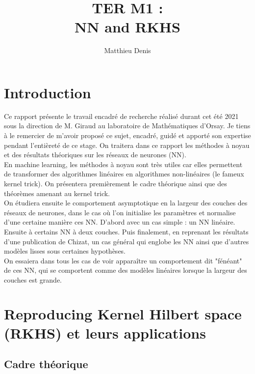 \documentclass[a4paper, 11pt, french]{article}
\title{TER M1 : \\ NN and RKHS}
\author{Matthieu Denis}
\theoremstyle{definition}
\begin{document}
	
	\maketitle
	\newpage
	
	\tableofcontents
	\newpage
	
	\section{Introduction}
	
	Ce rapport présente le travail encadré de recherche réalisé durant cet été 2021 sous la direction de M. Giraud au laboratoire de Mathématiques d'Orsay. Je tiens à le remercier de m'avoir proposé ce sujet, encadré, guidé et apporté son expertise pendant l'entièreté de ce stage. On traitera dans ce rapport les méthodes à noyau et des résultats théoriques sur les réseaux de neurones (NN). \\
	
	En machine learning, les méthodes à noyau sont très utiles car elles permettent de transformer des algorithmes linéaires en algorithmes non-linéaires (le fameux kernel trick). On présentera premièrement le cadre théorique ainsi que des théorèmes amenant au kernel trick. \\
	
	On étudiera ensuite le comportement asymptotique en la largeur des couches des réseaux de neurones, dans le cas où l'on initialise les paramètres et normalise d'une certaine manière ces NN. D'abord avec un cas simple : un NN linéaire. Ensuite à certains NN à deux couches. Puis finalement, en reprenant les résultats d'une publication de Chizat, un cas général qui englobe les NN ainsi que d'autres modèles lisses sous certaines hypothèses.  \\
	
	On essaiera dans tous les cas de voir apparaître un comportement dit "fénéant" de ces NN, qui se comportent comme des modèles linéaires lorsque la largeur des couches est grande.
	
	\newpage
	
	\section{Reproducing Kernel Hilbert space (RKHS) et leurs applications}
	
	\subsection{Cadre théorique}
	
\end{document}
